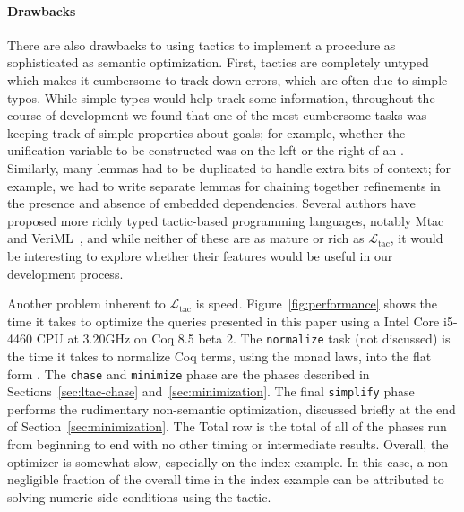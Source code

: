 \documentclass{sigplanconf}
\newcommand{\ltac}[0]{\ensuremath{\mathcal{L}_{\mathrm{tac}}}}
\begin{document}
\paragraph{Drawbacks}
There are also drawbacks to using tactics to implement a procedure as sophisticated as semantic optimization.
First, tactics are completely untyped which makes it cumbersome to track down errors, which are often due to simple typos.
While simple types would help track some information, throughout the course of development we found that one of the most cumbersome tasks was keeping track of simple properties about goals; for example, whether the unification variable to be constructed was on the left or the right of an .
Similarly, many lemmas had to be duplicated to handle extra bits of context; for example, we had to write separate lemmas for chaining together refinements in the presence and absence of embedded dependencies.
Several authors have proposed more richly typed tactic-based programming languages, notably Mtac~\cite{ziliani2013mtac} and VeriML~\cite{stampoulis2010veriml}, and while neither of these are as mature or rich as \ltac, it would be interesting to explore whether their features would be useful in our development process.

Another problem inherent to \ltac{} is speed.
Figure~\ref{fig:performance} shows the time it takes to optimize the queries presented in this paper using a Intel Core i5-4460  CPU at 3.20GHz on Coq 8.5 beta 2.  The {\tt normalize} task (not discussed) is the time it takes to normalize Coq terms, using the monad laws, into the flat form .
The {\tt chase} and {\tt minimize} phase are the phases described in Sections~\ref{sec:ltac-chase} and~\ref{sec:minimization}.
The final {\tt simplify} phase performs the rudimentary non-semantic optimization, discussed briefly at the end of Section~\ref{sec:minimization}.
The Total row is the total of all of the phases run from beginning to end with no other timing or intermediate results.
Overall, the optimizer is somewhat slow, especially on the index example.
In this case, a non-negligible fraction of the overall time in the index example can be attributed to solving numeric side conditions using the  tactic.
\end{document}
